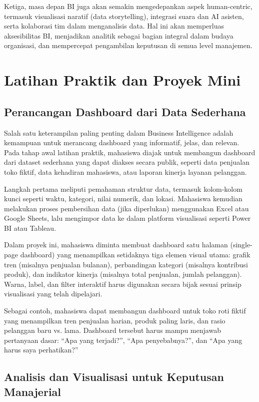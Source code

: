 Ketiga, masa depan BI juga akan semakin mengedepankan aspek human-centric, termasuk visualisasi naratif (data storytelling), integrasi suara dan AI asisten, serta kolaborasi tim dalam menganalisis data. Hal ini akan memperluas aksesibilitas BI, menjadikan analitik sebagai bagian integral dalam budaya organisasi, dan mempercepat pengambilan keputusan di semua level manajemen.


\section{Latihan Praktik dan Proyek Mini}
\subsection{Perancangan Dashboard dari Data Sederhana}

Salah satu keterampilan paling penting dalam Business Intelligence adalah kemampuan untuk merancang dashboard yang informatif, jelas, dan relevan. Pada tahap awal latihan praktik, mahasiswa diajak untuk membangun dashboard dari dataset sederhana yang dapat diakses secara publik, seperti data penjualan toko fiktif, data kehadiran mahasiswa, atau laporan kinerja layanan pelanggan.

Langkah pertama meliputi pemahaman struktur data, termasuk kolom-kolom kunci seperti waktu, kategori, nilai numerik, dan lokasi. Mahasiswa kemudian melakukan proses pembersihan data (jika diperlukan) menggunakan Excel atau Google Sheets, lalu mengimpor data ke dalam platform visualisasi seperti Power BI atau Tableau.

Dalam proyek ini, mahasiswa diminta membuat dashboard satu halaman (single-page dashboard) yang menampilkan setidaknya tiga elemen visual utama: grafik tren (misalnya penjualan bulanan), perbandingan kategori (misalnya kontribusi produk), dan indikator kinerja (misalnya total penjualan, jumlah pelanggan). Warna, label, dan filter interaktif harus digunakan secara bijak sesuai prinsip visualisasi yang telah dipelajari.

Sebagai contoh, mahasiswa dapat membangun dashboard untuk toko roti fiktif yang menampilkan tren penjualan harian, produk paling laris, dan rasio pelanggan baru vs. lama. Dashboard tersebut harus mampu menjawab pertanyaan dasar: “Apa yang terjadi?”, “Apa penyebabnya?”, dan “Apa yang harus saya perhatikan?”

\subsection{Analisis dan Visualisasi untuk Keputusan Manajerial}

